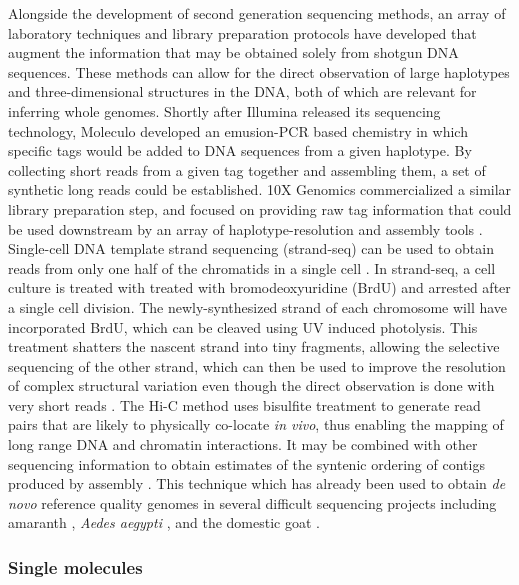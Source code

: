 Alongside the development of second generation sequencing methods, an array of laboratory techniques and library preparation protocols have developed that augment the information that may be obtained solely from shotgun DNA sequences.
These methods can allow for the direct observation of large haplotypes and three-dimensional structures in the DNA, both of which are relevant for inferring whole genomes.
Shortly after Illumina released its sequencing technology, Moleculo developed an emusion-PCR based chemistry in which specific tags would be added to DNA sequences from a given haplotype.
By collecting short reads from a given tag together and assembling them, a set of synthetic long reads could be established.
10X Genomics commercialized a similar library preparation step, and focused on providing raw tag information that could be used downstream by an array of haplotype-resolution and assembly tools \cite{mostovoy2016hybrid}.
Single-cell DNA template strand sequencing (strand-seq) can be used to obtain reads from only one half of the chromatids in a single cell \cite{falconer2012dna}.
In strand-seq, a cell culture is treated with treated with bromodeoxyuridine (BrdU) and arrested after a single cell division.
The newly-synthesized strand of each chromosome will have incorporated BrdU, which can be cleaved using UV induced photolysis.
This treatment shatters the nascent strand into tiny fragments, allowing the selective sequencing of the other strand, which can then be used to improve the resolution of complex structural variation even though the direct observation is done with very short reads \cite{porubsky2016direct}.
The Hi-C method \cite{lieberman2009comprehensive} uses bisulfite treatment to generate read pairs that are likely to physically co-locate \emph{in vivo}, thus enabling the mapping of long range DNA and chromatin interactions.
It may be combined with other sequencing information to obtain estimates of the syntenic ordering of contigs produced by assembly \cite{ghurye2018integrating}.
This technique which has already been used to obtain \emph{de novo} reference quality genomes in several difficult sequencing projects including amaranth \cite{lightfoot2017single}, \emph{Aedes aegypti} \cite{dudchenko2017novo}, and the domestic goat \cite{bickhart2017single}.

\subsubsection{Single molecules}

